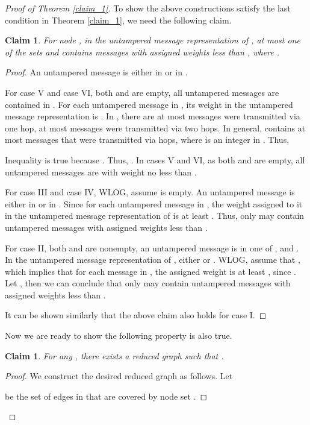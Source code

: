 \documentclass[letterpaper, 11pt]{article}
\newtheorem{claim}[theorem]{Claim}
\begin{document}
\begin{proof}[Proof of Theorem \ref{claim_1}]
To show the above constructions satisfy the last condition in Theorem \ref{claim_1}, we need the following claim.

\begin{claim}
\label{claimw}
For node , in the untampered message representation of , at most one of the sets  and  contains messages with assigned weights less than , where .
\end{claim}

\begin{proof}
An untampered message is either in  or in .

For case V and case VI, both  and  are empty, all untampered messages are contained in .
For each untampered message in , its weight in the untampered message representation is . In , there are at most  messages were transmitted via one hop, at most  messages were transmitted via two hops. In general,  contains at most  messages that were transmitted via  hops, where  is an integer in . Thus,

Inequality  is true because . Thus, . In cases V and VI, as both  and  are empty, all untampered messages are with weight no less than .

For case III and case IV, WLOG, assume  is empty.
An untampered message is either in  or in . Since for each untampered message in , the weight assigned to it in the untampered message representation of  is at least . Thus, only  may contain untampered messages with assigned weights less than .

For case II, both  and  are nonempty, an untampered message is in one of ,  and . In the untampered message representation of ,  either  or .  WLOG, assume that , which  implies that for each message in , the assigned weight is at least , since . Let , then we can conclude that only  may contain untampered messages with assigned weights less than .

It can be shown similarly that the above claim also holds for case I.

\end{proof}
Now we are ready to show the following property is also true.

\begin{claim}
\label{claimrg}
For any , there exists a reduced graph  such that
.
\end{claim}
\begin{proof}
 We construct the desired reduced graph  as follows.
 Let
 
  be the set of edges in  that are covered by node set .


\end{proof}
\end{proof}
\end{document}
